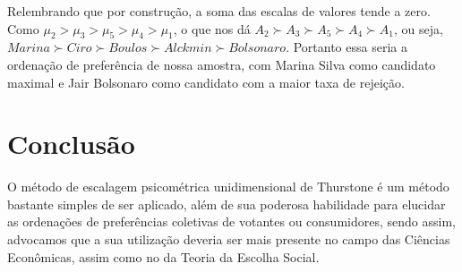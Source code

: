\documentclass[
	article,			%
	12pt,				%
	oneside,			%
	a4paper,			%
	english,			%
	brazil,				%
	]{abntex2}
\begin{document}
Relembrando que por construção, a soma das escalas de valores tende a zero. 
Como $\mu_\textit{2} > \mu_\textit{3} > \mu_\textit{5} > \mu_\textit{4} > \mu_\textit{1}$, o que nos dá $A_\textit{2} \succ A_\textit{3} \succ A_\textit{5} \succ A_\textit{4} \succ A_\textit{1}$, ou seja, $Marina \succ Ciro\succ Boulos \succ Alckmin \succ Bolsonaro$. Portanto essa seria a ordenação de preferência de nossa amostra, com Marina Silva como candidato maximal e Jair Bolsonaro como candidato com a maior taxa de rejeição.











\section{Conclusão}
O método de escalagem psicométrica unidimensional de Thurstone é um método bastante simples de ser aplicado, além de sua poderosa habilidade para elucidar as ordenações de preferências coletivas de votantes ou consumidores, sendo assim, advocamos que a sua utilização deveria ser mais presente no campo das Ciências Econômicas, assim como no da Teoria da Escolha Social. 
% 
\newpage





\postextual



%
%
\end{document}

